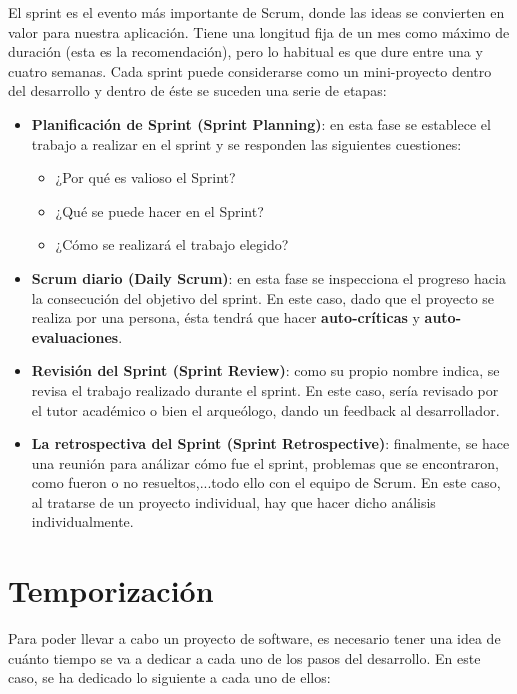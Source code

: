 El sprint es el evento más importante de Scrum, donde las ideas se convierten en valor
para nuestra aplicación. Tiene una longitud fija de un mes como máximo de duración (esta
es la recomendación), pero lo habitual es que dure entre una y cuatro semanas. Cada sprint
puede considerarse como un mini-proyecto dentro del desarrollo y dentro de éste se suceden
una serie de etapas:

    \begin{itemize}
        \item \textbf{Planificación de Sprint (Sprint Planning)}: en esta fase se establece
        el trabajo a realizar en el sprint y se responden las siguientes cuestiones:
            \begin{itemize}
                \item ¿Por qué es valioso el Sprint?
                \item ¿Qué se puede hacer en el Sprint?
                \item ¿Cómo se realizará el trabajo elegido?
            \end{itemize}
        \item \textbf{Scrum diario (Daily Scrum)}: en esta fase se inspecciona el progreso
        hacia la consecución del objetivo del sprint. En este caso, dado que el proyecto
        se realiza por una persona, ésta tendrá que hacer \textbf{auto-críticas} y
        \textbf{auto-evaluaciones}.
        \item \textbf{Revisión del Sprint (Sprint Review)}: como su propio nombre indica,
        se revisa el trabajo realizado durante el sprint. En este caso, sería revisado por
        el tutor académico o bien el arqueólogo, dando un feedback al desarrollador.
        \item \textbf{La retrospectiva del Sprint (Sprint Retrospective)}: finalmente, se
        hace una reunión para análizar cómo fue el sprint, problemas que se encontraron,
        como fueron o no resueltos,...todo ello con el equipo de Scrum. En este caso, al
        tratarse de un proyecto individual, hay que hacer dicho análisis individualmente. 
    \end{itemize}



\section{Temporización} \label{sec:timing}
Para poder llevar a cabo un proyecto de software, es necesario tener una idea de cuánto
tiempo se va a dedicar a cada uno de los pasos del desarrollo. En este caso, se ha
dedicado lo siguiente a cada uno de ellos:

